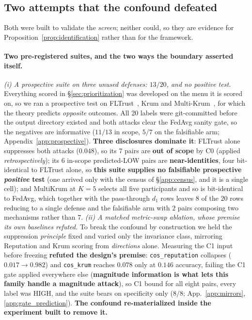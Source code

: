 \documentclass{article}
\begin{document}
\subsection{Two attempts that the confound defeated}

Both were built to validate the \emph{screen}; neither could, so they are evidence for Proposition~\ref{prop:identification} rather than for the framework.

\paragraph{Two pre-registered suites, and the two ways the boundary asserted itself.} \emph{(i) A prospective suite on three unused defenses: $13/20$, and no positive test.} Everything scored in \S\ref{sec:prioritization} was developed on the menu it is scored on, so we ran a prospective test on FLTrust~\citep{cao2021fltrust}, Krum and Multi-Krum~\citep{blanchard2017machine}, for which the theory predicts \emph{opposite} outcomes. All 20 labels were git-committed before the output directory existed and both attacks clear the FedAvg sanity gate, so the negatives are informative ($11/13$ in scope, $5/7$ on the falsifiable arm; Appendix~\ref{app:prospective}). \textbf{Three disclosures dominate it}: FLTrust alone suppresses both attacks ($0.048$), so its 7 pairs are \textbf{out of scope} by C0 (applied \emph{retrospectively}); its 6 in-scope predicted-LOW pairs are \textbf{near-identities}, four bit-identical to FLTrust alone, so \textbf{this suite supplies no falsifiable prospective \emph{positive} test} (one arrived only with the census of \S\ref{app:census}, and it is a single cell); and MultiKrum at $K{=}5$ selects all five participants and so is bit-identical to FedAvg, which together with the pass-through $d_1$ rows leaves $8$ of the $20$ rows reducing to a single defense and the falsifiable arm with $2$ pairs composing two mechanisms rather than $7$. \emph{(ii) A matched metric-swap ablation, whose premise its own baselines refuted.} To break the confound by construction we held the suppression \emph{principle} fixed and varied only the invariance class, mirroring Reputation and Krum scoring from \emph{directions} alone. Measuring the C1 input before freezing \textbf{refuted the design's premise}: \texttt{cos\_reputation} collapses ($0.017 \to 0.982$) and \texttt{cos\_krum} reaches $0.078$ only at $0.146$ accuracy, failing the C1 gate applied everywhere else (\textbf{magnitude information is what lets this family handle a magnitude attack}), so C1 bound for all eight pairs, every label was HIGH, and the suite bears on specificity only ($8/8$; App.~\ref{app:mirrors}, \ref{app:gate_prediction}). \textbf{The confound re-materialized inside the experiment built to remove it.}
\end{document}
